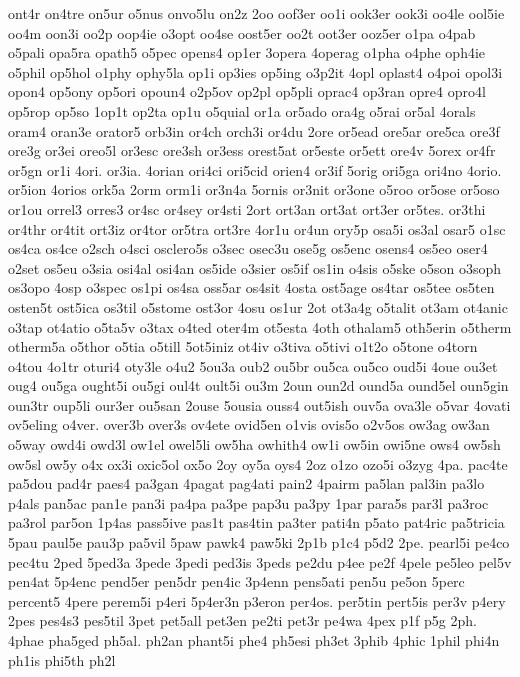 {ont4r
on4tre
on5ur
o5nus
onvo5lu
on2z
2oo
oof3er
oo1i
ook3er
ook3i
oo4le
ool5ie
oo4m
oon3i
oo2p
oop4ie
o3opt
oo4se
oost5er
oo2t
oot3er
ooz5er
o1pa
o4pab
o5pali
opa5ra
opath5
o5pec
opens4
op1er
3opera
4operag
o1pha
o4phe
oph4ie
o5phil
op5hol
o1phy
ophy5la
op1i
op3ies
op5ing
o3p2it
4opl
oplast4
o4poi
opol3i
opon4
op5ony
op5ori
opoun4
o2p5ov
op2pl
op5pli
oprac4
op3ran
opre4
opro4l
op5rop
op5so
1op1t
op2ta
op1u
o5quial
or1a
or5ado
ora4g
o5rai
or5al
4orals
oram4
oran3e
orator5
orb3in
or4ch
orch3i
or4du
2ore
or5ead
ore5ar
ore5ca
ore3f
ore3g
or3ei
oreo5l
or3esc
ore3sh
or3ess
orest5at
or5este
or5ett
ore4v
5orex
or4fr
or5gn
or1i
4ori.
or3ia.
4orian
ori4ci
ori5cid
orien4
or3if
5orig
ori5ga
ori4no
4orio.
or5ion
4orios
ork5a
2orm
orm1i
or3n4a
5ornis
or3nit
or3one
o5roo
or5ose
or5oso
or1ou
orrel3
orres3
or4sc
or4sey
or4sti
2ort
ort3an
ort3at
ort3er
or5tes.
or3thi
or4thr
or4tit
ort3iz
or4tor
or5tra
ort3re
4or1u
or4un
ory5p
osa5i
os3al
osar5
o1sc
os4ca
os4ce
o2sch
o4sci
osclero5s
o3sec
osec3u
ose5g
os5enc
osens4
os5eo
oser4
o2set
os5eu
o3sia
osi4al
osi4an
os5ide
o3sier
os5if
os1in
o4sis
o5ske
o5son
o3soph
os3opo
4osp
o3spec
os1pi
os4sa
oss5ar
os4sit
4osta
ost5age
os4tar
os5tee
os5ten
osten5t
ost5ica
os3til
o5stome
ost3or
4osu
os1ur
2ot
ot3a4g
o5talit
ot3am
ot4anic
o3tap
ot4atio
o5ta5v
o3tax
o4ted
oter4m
ot5esta
4oth
othalam5
oth5erin
o5therm
otherm5a
o5thor
o5tia
o5till
5ot5iniz
ot4iv
o3tiva
o5tivi
o1t2o
o5tone
o4torn
o4tou
4o1tr
oturi4
oty3le
o4u2
5ou3a
oub2
ou5br
ou5ca
ou5co
oud5i
4oue
ou3et
oug4
ou5ga
ought5i
ou5gi
oul4t
oult5i
ou3m
2oun
oun2d
ound5a
ound5el
oun5gin
oun3tr
oup5li
our3er
ou5san
2ouse
5ousia
ouss4
out5ish
ouv5a
ova3le
o5var
4ovati
ov5eling
o4ver.
over3b
over3s
ov4ete
ovid5en
o1vis
ovis5o
o2v5os
ow3ag
ow3an
o5way
owd4i
owd3l
ow1el
owel5li
ow5ha
owhith4
ow1i
ow5in
owi5ne
ows4
ow5sh
ow5sl
ow5y
o4x
ox3i
oxic5ol
ox5o
2oy
oy5a
oys4
2oz
o1zo
ozo5i
o3zyg
4pa.
pac4te
pa5dou
pad4r
paes4
pa3gan
4pagat
pag4ati
pain2
4pairm
pa5lan
pal3in
pa3lo
p4als
pan5ac
pan1e
pan3i
pa4pa
pa3pe
pap3u
pa3py
1par
para5s
par3l
pa3roc
pa3rol
par5on
1p4as
pass5ive
pas1t
pas4tin
pa3ter
pati4n
p5ato
pat4ric
pa5tricia
5pau
paul5e
pau3p
pa5vil
5paw
pawk4
paw5ki
2p1b
p1c4
p5d2
2pe.
pearl5i
pe4co
pec4tu
2ped
5ped3a
3pede
3pedi
ped3is
3peds
pe2du
p4ee
pe2f
4pele
pe5leo
pel5v
pen4at
5p4enc
pend5er
pen5dr
pen4ic
3p4enn
pens5ati
pen5u
pe5on
5perc
percent5
4pere
perem5i
p4eri
5p4er3n
p3eron
per4os.
per5tin
pert5is
per3v
p4ery
2pes
pes4s3
pes5til
3pet
pet5all
pet3en
pe2ti
pet3r
pe4wa
4pex
p1f
p5g
2ph.
4phae
pha5ged
ph5al.
ph2an
phant5i
phe4
ph5esi
ph3et
3phib
4phic
1phil
phi4n
ph1is
phi5th
ph2l
}
